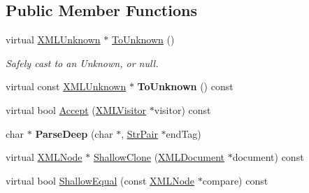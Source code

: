 \subsection*{Public Member Functions}
\begin{DoxyCompactItemize}
\item 
\hypertarget{classtinyxml2_1_1_x_m_l_unknown_af4374856421921cad578c8affae872b6}{virtual \hyperlink{classtinyxml2_1_1_x_m_l_unknown}{X\-M\-L\-Unknown} $\ast$ \hyperlink{classtinyxml2_1_1_x_m_l_unknown_af4374856421921cad578c8affae872b6}{To\-Unknown} ()}\label{classtinyxml2_1_1_x_m_l_unknown_af4374856421921cad578c8affae872b6}

\begin{DoxyCompactList}\small\item\em Safely cast to an Unknown, or null. \end{DoxyCompactList}\item 
\hypertarget{classtinyxml2_1_1_x_m_l_unknown_a257987e79955399e6e9f119b58d4bb30}{virtual const \hyperlink{classtinyxml2_1_1_x_m_l_unknown}{X\-M\-L\-Unknown} $\ast$ {\bfseries To\-Unknown} () const }\label{classtinyxml2_1_1_x_m_l_unknown_a257987e79955399e6e9f119b58d4bb30}

\item 
virtual bool \hyperlink{classtinyxml2_1_1_x_m_l_unknown_a0d341ab804a1438a474810bb5bd29dd5}{Accept} (\hyperlink{classtinyxml2_1_1_x_m_l_visitor}{X\-M\-L\-Visitor} $\ast$visitor) const 
\item 
\hypertarget{classtinyxml2_1_1_x_m_l_unknown_a0e4f3509dee42a4d45a7f0002be568cc}{char $\ast$ {\bfseries Parse\-Deep} (char $\ast$, \hyperlink{classtinyxml2_1_1_str_pair}{Str\-Pair} $\ast$end\-Tag)}\label{classtinyxml2_1_1_x_m_l_unknown_a0e4f3509dee42a4d45a7f0002be568cc}

\item 
virtual \hyperlink{classtinyxml2_1_1_x_m_l_node}{X\-M\-L\-Node} $\ast$ \hyperlink{classtinyxml2_1_1_x_m_l_unknown_aa09fc7cb0cd64d6bb9c5ae00ffc549ec}{Shallow\-Clone} (\hyperlink{classtinyxml2_1_1_x_m_l_document}{X\-M\-L\-Document} $\ast$document) const 
\item 
virtual bool \hyperlink{classtinyxml2_1_1_x_m_l_unknown_a0169df157bf69a092b404ca49621ff1a}{Shallow\-Equal} (const \hyperlink{classtinyxml2_1_1_x_m_l_node}{X\-M\-L\-Node} $\ast$compare) const 
\end{DoxyCompactItemize}
